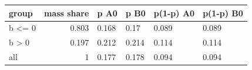 \begingroup\small
\setlength{\tabcolsep}{3pt}
\renewcommand{\arraystretch}{1.04}
\begin{tabularx}{\linewidth}{XrXXXX}
\toprule
group & mass share & p A0 & p B0 & p(1-p) A0 & p(1-p) B0 \\
\midrule
b \textless{}= 0 & 0.803 & 0.168 & 0.17 & 0.089 & 0.089 \\
b \textgreater{} 0 & 0.197 & 0.212 & 0.214 & 0.114 & 0.114 \\
all & 1 & 0.177 & 0.178 & 0.094 & 0.094 \\
\bottomrule
\end{tabularx}
\endgroup
